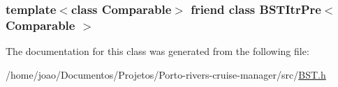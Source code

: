 \subsubsection[{\texorpdfstring{B\+S\+T\+Itr\+Pre$<$ Comparable $>$}{BSTItrPre< Comparable >}}]{\setlength{\rightskip}{0pt plus 5cm}template$<$class Comparable$>$ friend class {\bf B\+S\+T\+Itr\+Pre}$<$ Comparable $>$\hspace{0.3cm}{\ttfamily [friend]}}\hypertarget{classBST_a45a55df6f11541416d4ea7684c575c1a}{}\label{classBST_a45a55df6f11541416d4ea7684c575c1a}


The documentation for this class was generated from the following file\+:\begin{DoxyCompactItemize}
\item 
/home/joao/\+Documentos/\+Projetos/\+Porto-\/rivers-\/cruise-\/manager/src/\hyperlink{BST_8h}{B\+S\+T.\+h}\end{DoxyCompactItemize}
